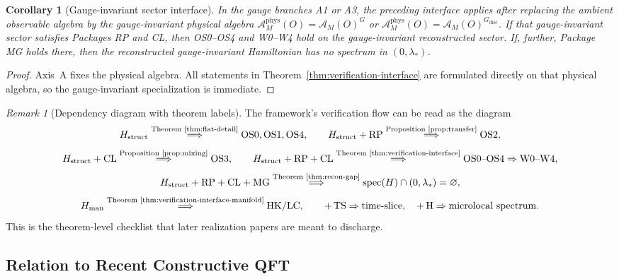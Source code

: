 \documentclass[12pt,a4paper]{article}
\theoremstyle{plain}
\newtheorem{corollary}[theorem]{Corollary}
\theoremstyle{definition}
\theoremstyle{remark}
\newtheorem{remark}[theorem]{Remark}
\newcommand{\spec}{\operatorname{spec}}
\newcommand{\alg}{\mathcal{A}}
\begin{document}
\begin{corollary}[Gauge-invariant sector interface]\label{cor:gauge-interface}
  In the gauge branches A1 or A3, the preceding interface applies
  after replacing the ambient observable algebra by the
  gauge-invariant physical algebra
  $\alg^{\mathrm{phys}}_M(O) = \alg_M(O)^G$ or
  $\alg^{\mathrm{phys}}_M(O) = \alg_M(O)^{G_{\mathrm{disc}}}$.
  If that gauge-invariant sector satisfies Packages RP and CL, then
  OS0--OS4 and W0--W4 hold on the gauge-invariant reconstructed
  sector. If, further, Package MG holds there, then the reconstructed
  gauge-invariant Hamiltonian has no spectrum in $(0,\lambda_*)$.
\end{corollary}
\begin{proof}
  Axis~A fixes the physical algebra. All statements in
  Theorem~\ref{thm:verification-interface} are formulated directly on
  that physical algebra, so the gauge-invariant specialization is
  immediate.
\end{proof}

\begin{remark}[Dependency diagram with theorem labels]
  The framework's verification flow can be read as the diagram
  \[
    H_{\mathrm{struct}}
    \overset{\text{Theorem~\ref{thm:flat-detail}}}{\Longrightarrow}
    \mathrm{OS0},\mathrm{OS1},\mathrm{OS4},
    \qquad
    H_{\mathrm{struct}} + \mathrm{RP}
    \overset{\text{Proposition~\ref{prop:transfer}}}{\Longrightarrow}
    \mathrm{OS2},
  \]
  \[
    H_{\mathrm{struct}} + \mathrm{CL}
    \overset{\text{Proposition~\ref{prop:mixing}}}{\Longrightarrow}
    \mathrm{OS3},
    \qquad
    H_{\mathrm{struct}} + \mathrm{RP} + \mathrm{CL}
    \overset{\text{Theorem~\ref{thm:verification-interface}}}{\Longrightarrow}
    \mathrm{OS0\text{--}OS4} \Rightarrow \mathrm{W0\text{--}W4},
  \]
  \[
    H_{\mathrm{struct}} + \mathrm{RP} + \mathrm{CL} + \mathrm{MG}
    \overset{\text{Theorem~\ref{thm:recon-gap}}}{\Longrightarrow}
    \spec(H)\cap (0,\lambda_*) = \varnothing,
  \]
  \[
    H_{\mathrm{man}}
    \overset{\text{Theorem~\ref{thm:verification-interface-manifold}}}{\Longrightarrow}
    \mathrm{HK/LC},
    \qquad
    +\,\mathrm{TS} \Rightarrow \mathrm{time\text{-}slice},
    \quad
    +\,\mathrm{H} \Rightarrow \mathrm{microlocal\ spectrum}.
  \]
  This is the theorem-level checklist that later realization papers
  are meant to discharge.
\end{remark}

\subsection{Relation to Recent Constructive QFT}
\end{document}
